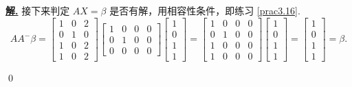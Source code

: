 \documentclass[10pt,openany]{article}
\theoremstyle{thmstyle} %
\theoremstyle{defstyle} %
\theoremstyle{prostyle} %
\theoremstyle{exastyle}
\theoremstyle{remstyle}
\newenvironment{solution}{\par\underline{\textbf{解.}} \;\fangsong}{\qed\par}
\begin{document}
\begin{solution}
	接下来判定 \( AX=\beta \) 是否有解，用相容性条件，即练习 \ref{prac3.16}.
	\[ AA^{-}\beta=\begin{bmatrix}
		1 & 0 & 2 \\
		0 & 1 & 0 \\
		1 & 0 & 2 \\
		1 & 0 & 2
	\end{bmatrix}\begin{bmatrix}
	1 & 0 & 0 & 0 \\
	0 & 1 & 0 & 0 \\
	0 & 0 & 0 & 0
	\end{bmatrix}\begin{bmatrix}
	1 \\ 0 \\ 1 \\ 1
	\end{bmatrix}=\begin{bmatrix}
	1 & 0 & 0 & 0\\
	0 & 1 & 0 & 0 \\
	1 & 0 & 0 & 0 \\
	1 & 0 & 0 & 0
	\end{bmatrix}\begin{bmatrix}
	1 \\ 0 \\ 1 \\ 1
	\end{bmatrix}=\begin{bmatrix}
	1 \\ 0 \\ 1 \\ 1
	\end{bmatrix}=\beta. \]
	

\end{solution}
\end{document}
